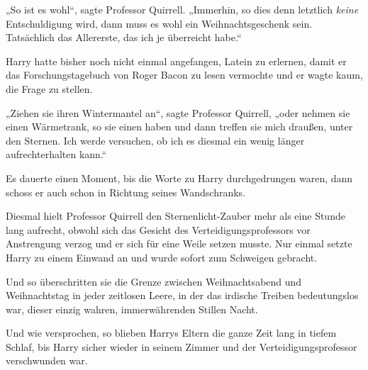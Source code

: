„So ist es wohl“, sagte Professor Quirrell.
„Immerhin, so dies denn letztlich \emph{keine} Entschuldigung wird, dann muss es wohl ein Weihnachtsgeschenk sein. Tatsächlich das Allererste, das ich je überreicht habe.“

Harry hatte bisher noch nicht einmal angefangen, Latein zu erlernen, damit er das Forschungstagebuch von Roger Bacon zu lesen vermochte und er wagte kaum, die Frage zu stellen.

„Ziehen sie ihren Wintermantel an“, sagte Professor Quirrell, „oder nehmen sie einen Wärmetrank, so sie einen haben und dann treffen sie mich draußen, unter den Sternen. Ich werde versuchen, ob ich es diesmal ein wenig länger aufrechterhalten kann.“

Es dauerte einen Moment, bis die Worte zu Harry durchgedrungen waren, dann schoss er auch schon in Richtung seines Wandschranks.

Diesmal hielt Professor Quirrell den Sternenlicht-Zauber mehr als eine Stunde lang aufrecht, obwohl sich das Gesicht des Verteidigungsprofessors vor Anstrengung verzog und er sich für eine Weile setzen musste. Nur einmal setzte Harry zu einem Einwand an und wurde sofort zum Schweigen gebracht.

Und so überschritten sie die Grenze zwischen Weihnachtsabend und Weihnachtstag in jeder zeitlosen Leere, in der das irdische Treiben bedeutungslos war, dieser einzig wahren, immerwährenden Stillen Nacht.

Und wie versprochen, so blieben Harrys Eltern die ganze Zeit lang in tiefem Schlaf, bis Harry sicher wieder in seinem Zimmer und der Verteidigungsprofessor verschwunden war.
